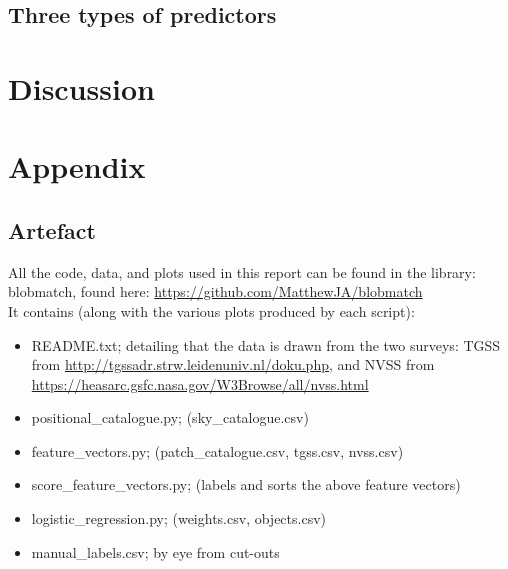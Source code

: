 \documentclass[12pt,a4paper]{article}
\begin{document}
\subsection{}
\subsection{Three types of predictors}
\subsection{}


\section{Discussion}

\newpage
\section{Appendix}
\subsection{Artefact}
All the code, data, and plots used in this report can be found in the library: blobmatch, found here: \url{https://github.com/MatthewJA/blobmatch}\\

It contains (along with the various plots produced by each script):
\begin{itemize}
    \item README.txt; detailing that the data is drawn from the two surveys: TGSS from \url{http://tgssadr.strw.leidenuniv.nl/doku.php}, and NVSS from \url{https://heasarc.gsfc.nasa.gov/W3Browse/all/nvss.html}
    \item positional\_catalogue.py; (sky\_catalogue.csv)
    \item feature\_vectors.py; (patch\_catalogue.csv, tgss.csv, nvss.csv)
    \item score\_feature\_vectors.py; (labels and sorts the above feature vectors)
    \item logistic\_regression.py; (weights.csv, objects.csv)
    \item manual\_labels.csv; by eye from cut-outs
\end{itemize}
\end{document}
